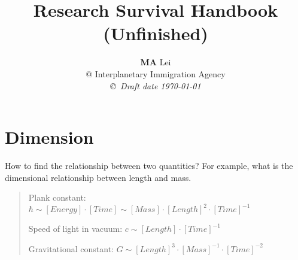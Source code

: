 \documentclass[12pt,a4paper]{book}
\begin{document}
\title{Research Survival Handbook \\ (\textbf{Unfinished})}
\author{{\bf MA} Lei  \\
@ Interplanetary Immigration Agency \\
{\small\em \copyright \ Draft date \today}}
\date{}
\maketitle


\newcommand{\dd}{\mathrm d}
\newenvironment{eqnset}
{\begin{equation}\left \bracevert \begin{array}{l}}
{\end{array} \right. \end{equation}}

\newenvironment{eqn}
{\begin{equation}\left \bracevert \begin{array}{l}}
{\end{array} \right. \end{equation}}



























\section{Dimension}

How to find the relationship between two quantities? For example, what is the dimensional relationship between length and mass.
\begin{quotation}
Plank constant: $\hbar \sim [Energy]\cdot [Time] \sim [Mass]\cdot [Length]^2 \cdot [Time]^{-1}$ 

Speed of light in vacuum: $c\sim [Length]\cdot [Time]^{-1}$

Gravitational constant: $G \sim [Length]^3\cdot [Mass]^{-1} \cdot [Time]^{-2}$
\end{quotation}
\end{document}
